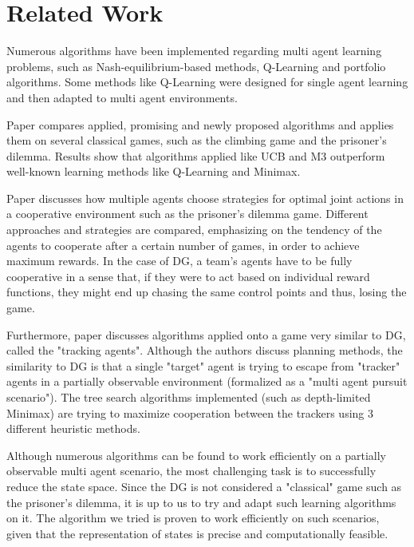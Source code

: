 \documentclass[conference]{IEEEtran}
\begin{document}
\section{Related Work}

Numerous algorithms have been implemented regarding multi agent learning problems, such as Nash-equilibrium-based methods, Q-Learning and portfolio algorithms\cite{bouzy}. Some methods like Q-Learning were designed for single agent learning and then adapted to multi agent environments.

Paper \cite{bouzy} compares applied, promising and newly proposed algorithms and applies them on several classical games, such as the climbing game and the prisoner's dilemma. Results show that algorithms applied like UCB and M3 outperform well-known learning methods like Q-Learning and Minimax.

Paper \cite{mach} discusses how multiple agents choose strategies for optimal joint actions in a cooperative environment such as the prisoner's dilemma game. Different approaches and strategies are compared, emphasizing on the tendency of the agents to cooperate after a certain number of games, in order to achieve maximum rewards. In the case of DG, a team's agents have to be fully cooperative in a sense that, if they were to act based on individual reward functions, they might end up chasing the same control points and thus, losing the game.

Furthermore, paper \cite{strats} discusses algorithms applied onto a game very similar to DG, called the "tracking agents". Although the authors discuss planning methods, the similarity to DG is that a single "target" agent is trying to escape from "tracker" agents in a partially observable environment (formalized as a "multi agent pursuit scenario"). The tree search algorithms implemented (such as depth-limited Minimax) are trying to maximize cooperation between the trackers using 3 different heuristic methods.

Although numerous algorithms can be found to work efficiently on a partially observable multi agent scenario, the most challenging task is to successfully reduce the state space. Since the DG is not considered a "classical" game such as the prisoner's dilemma, it is up to us to try and adapt such learning algorithms on it. The algorithm we tried is proven to work efficiently on such scenarios, given that the representation of states is precise and computationally feasible.
\end{document}
